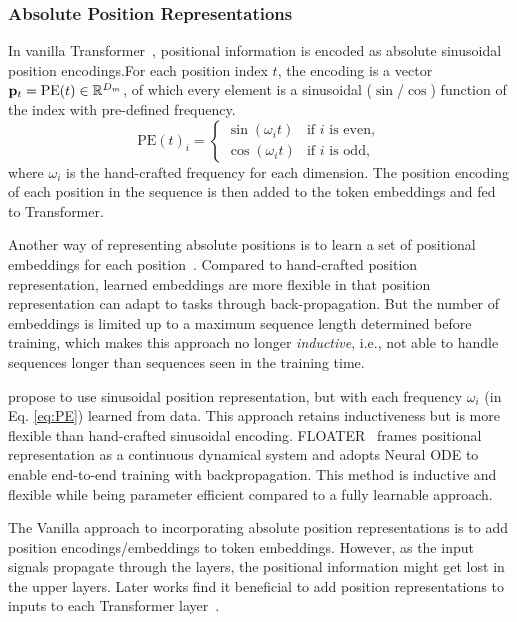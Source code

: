 \documentclass[manuscript,acmsmall,screen,nonacm]{acmart}
\theoremstyle{definition}
\begin{document}
\subsubsection{Absolute Position Representations}

In vanilla Transformer~\cite{vaswani2017attention}, positional information is encoded as absolute sinusoidal position encodings.For each position index $t$, the encoding is a vector $\mathbf{p}_t = \mathrm{PE}(t)\in\mathbb{R}^{D_m}$, of which every element is a sinusoidal ($\sin$/$\cos$) function of the index with pre-defined frequency.
\begin{equation}\label{eq:PE}
    \mathrm{PE}(t)_i = \begin{cases} \sin(\omega_i t) & \text{if }i\text{ is even},\\
    \cos(\omega_i t) & \text{if }i\text{ is odd},
    \end{cases}
\end{equation}
where $\omega_i$ is the hand-crafted frequency for each dimension. The position encoding of each position in the sequence is then added to the token embeddings and fed to Transformer.

Another way of representing absolute positions is to learn a set of positional embeddings for each position~\cite{gehring2017convolutional,devlin2019bert}. Compared to hand-crafted position representation, learned embeddings are more flexible in that position representation can adapt to tasks through back-propagation. But the number of embeddings is limited up to a maximum sequence length determined before training, which makes this approach no longer \textit{inductive}, i.e., not able to handle sequences longer than sequences seen in the training time\cite{liu2020floater,chu2021conditional}.

\citet{wang2021peonbert} propose to use sinusoidal position representation, but with each frequency $\omega_i$ (in Eq. \eqref{eq:PE}) learned from data. This approach retains inductiveness but is more flexible than hand-crafted sinusoidal encoding. FLOATER~\cite{liu2020floater} frames positional representation as a continuous dynamical system and adopts Neural ODE to enable end-to-end training with backpropagation. This method is inductive and flexible while being parameter efficient compared to a fully learnable approach.

The Vanilla approach to incorporating absolute position representations is to add position encodings/embeddings to token embeddings. However, as the input signals propagate through
the layers, the positional information might get lost in the upper layers. Later works find it beneficial to add position representations to inputs to each Transformer layer~\cite{alrfou2018characterlevel,universalxformer,liu2020floater,guo19lowrank}.
\end{document}
